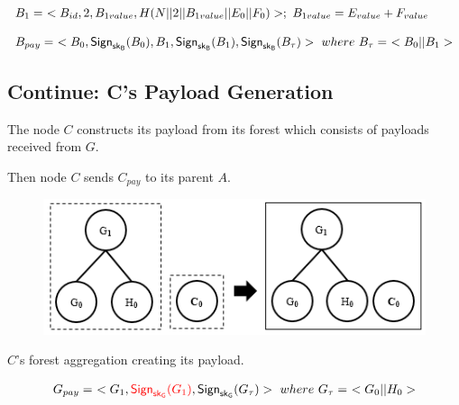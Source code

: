 \documentclass[%
  slidesonly,%
  semlayer%
  ]{seminar}                                  %
\newcommand{\sk}{\sf{sk}}
\begin{document}
\begin{slide}
      
      \begin{tiny}
        \begin{equation*}
          \begin{array}{l}
            B_{1} =\ < B_{id}, 2, B_{1value}, H(N||2||B_{1value}||E_{0}||F_{0})>;\ B_{1value} = E_{value} + F_{value}\\
            \\
            B_{pay} =\ < B_{0}, \textsf{Sign}_{\sk_{B}}(B_{0}), B_{1}, \textsf{Sign}_{\sk_{B}}(B_{1}), \textsf{Sign}_{\sk_{B}}(B_{\tau}) >\ where\ B_{\tau} =\ <B_{0} || B_{1}>\\
          \end{array}
          \label{eq:b-payload}
        \end{equation*}
      \end{tiny}


      \vfill
      \clearpage
    
    \subsection*{Continue: C's Payload Generation}  
      The node $C$ constructs its payload from its forest which consists of payloads received from $G$.

      Then node $C$ sends $C_{pay}$ to its parent $A$.

      \begin{figure}[h!]
        \centering
        \includegraphics[scale = 0.5]{images/c-forest-payload.png}
      \end{figure}
        \begin{center}
          $C$'s forest aggregation creating its payload.
        \end{center}
      \begin{equation*}
        \begin{array}{l}
          G_{pay} =\ <G_{1},\textcolor{red}{\textsf{Sign}_{\sk_{G}}(G_{1})}, \textsf{Sign}_{\sk_{G}}(G_{\tau})>\ where\ G_{\tau} =\ <G_{0} || H_{0}>\\
        \end{array}
      \end{equation*}
      

\end{slide}
\end{document}
